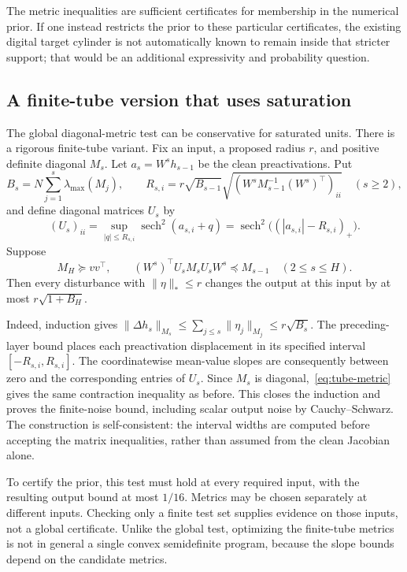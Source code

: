 The metric inequalities are sufficient certificates for membership in the
numerical prior. If one instead restricts the prior to these particular
certificates, the existing digital target cylinder is not automatically
known to remain inside that stricter support; that would be an additional
expressivity and probability question.

\subsection{A finite-tube version that uses saturation}

The global diagonal-metric test can be conservative for saturated units.
There is a rigorous finite-tube variant. Fix an input, a proposed radius
$r$, and positive definite diagonal $M_s$. Let $a_s=W^sh_{s-1}$ be the
clean preactivations. Put
\[
 B_s=N\sum_{j=1}^s\lambda_{\max}(M_j),\qquad
 R_{s,i}=r\sqrt{B_{s-1}}
       \sqrt{(W^sM_{s-1}^{-1}(W^s)^\top)_{ii}}
       \quad(s\ge2),
\]
and define diagonal matrices $U_s$ by
\[
 (U_s)_{ii}
  =\sup_{|q|\le R_{s,i}}\operatorname{sech}^2(a_{s,i}+q)
  =\operatorname{sech}^2\bigl((|a_{s,i}|-R_{s,i})_+\bigr).
\]
Suppose
\begin{equation}\label{eq:tube-metric}
 M_H\succeq vv^\top,\qquad
 (W^s)^\top U_sM_sU_sW^s\preceq M_{s-1}\quad(2\le s\le H).
\end{equation}
Then every disturbance with $\|\eta\|_*\le r$ changes the output at this
input by at most $r\sqrt{1+B_H}$.

Indeed, induction gives
$\|\Delta h_s\|_{M_s}\le\sum_{j\le s}\|\eta_j\|_{M_j}
\le r\sqrt{B_s}$.
The preceding-layer bound places each preactivation displacement in its
specified interval $[-R_{s,i},R_{s,i}]$. The coordinatewise mean-value
slopes are consequently between zero and the corresponding entries of
$U_s$. Since $M_s$ is diagonal,~\eqref{eq:tube-metric} gives the same
contraction inequality as before. This closes the induction and proves the
finite-noise bound, including scalar output noise by Cauchy--Schwarz.
The construction is self-consistent: the interval widths are computed
before accepting the matrix inequalities, rather than assumed from the
clean Jacobian alone.

To certify the prior, this test must hold at every required input, with
the resulting output bound at most $1/16$. Metrics may be chosen separately
at different inputs. Checking only a finite test set supplies evidence on
those inputs, not a global certificate. Unlike the global test, optimizing
the finite-tube metrics is not in general a single convex semidefinite
program, because the slope bounds depend on the candidate metrics.

